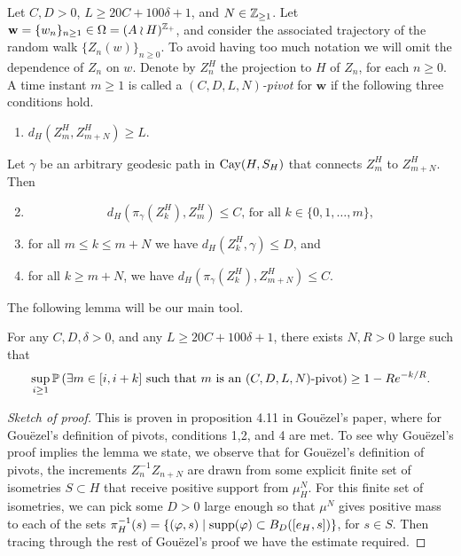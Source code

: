\begin{defin}
	Let $C,D>0$, $L\ge 20C+100\delta+1$, and $N\in \Z_{\ge 1}$. Let $\mathbf{w}=\{w_n\}_{n\ge 1} \in \Omega=(A\wr H)^{\Z_{+}}$, and consider the associated trajectory of the random walk $\{Z_n(w)\}_{n\ge 0}$. To avoid having too much notation we will omit the dependence of $Z_n$ on $w$. Denote by $Z_n^{H}$ the projection to $H$ of $Z_n$, for each $n\ge 0$. A time instant $m\ge 1$ is called a \emph{$(C,D,L,N)$-pivot} for $\mathbf{w}$ if the following three conditions hold. 
	\begin{enumerate}
		\item $d_{H}\left(Z^{H}_m,Z^{H}_{m+N}\right)\ge L$.
	\end{enumerate}

 Let $\gamma$ be an arbitrary geodesic path in $\cay{H}{S_H}$ that connects $Z^{H}_m$ to $Z^{H}_{m+N}.$ Then 
 
	\begin{enumerate}\setcounter{enumi}{1}
	\item
	\[ 
	d_H\left( \pi_{\gamma}\left(Z^{H}_k\right),Z^{H}_m \right)\le C \text{, for all }k\in\{0,1,\ldots, m\},
	\]
	\item for all $m\le k\le m+N$ we have $d_H\left(Z^{H}_k, \gamma \right)\le D$, and
	\item for all $k\ge m+N$, we have $d_H\left( \pi_{\gamma}\left(Z_k^H \right), Z^{H}_{m+N} \right)\le C$.
\end{enumerate}
\end{defin}

The following lemma will be our main tool.

\begin{lem}
	For any $C, D, \delta>0$, and any $L\ge 20C+100\delta+1$, there exists $N,R>0$ large such that 
	\[
	\sup_{i\ge 1}\P\left(\exists m\in [i,i+k]\text{ such that }m\text{ is an } (C,D,L,N)\text{-pivot}\right)\ge 1-Re^{-k/R}.
	\]
\end{lem}
\begin{proof}[Sketch of proof]
	This is proven in proposition 4.11 in Gouëzel's paper, where for Gouëzel's definition of pivots, conditions 1,2, and 4 are met. To see why Gouëzel's proof implies the lemma we state, we observe that for Gouëzel's definition of pivots, the increments $Z _{n} ^{-1} Z _{n+N} $ are drawn from some explicit finite set of isometries $ S \subset H $ that receive positive support from $ \mu_{H} ^{N} $. For this finite set of isometries, we can pick some $ D>0 $ large enough so that $ \mu ^{N} $ gives positive mass to each of the sets $ \pi _{H} ^{-1} (s) = \{(\varphi, s)\mid \supp{ \varphi} \subset B _{D} ([e_H,s])\}$, for $s\in S$. Then tracing through the rest of Gouëzel's proof we have the estimate required. 
\end{proof}


